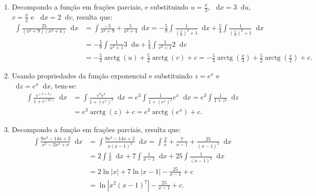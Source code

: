 \documentclass[12pt,a4paper]{article}
\newcommand*\diff{\mathop{}\!\mathrm{d}}
\newcommand*\arctg{\operatorname{arctg}}
\begin{document}
\begin{enumerate}
\begin{enumerate}
\item Decompondo a função em frações parciais, e substituindo $u=\frac{x}{3}$, $\diff x = 3 \diff u$, $v=\frac{x}{2}$ e $\diff x = 2 \diff v$, resulta que:
\begin{align*}
  \int \frac{25}{(x^2+9)(x^2+4)} \diff x
& = \int \frac{-5}{x^2+9} + \frac{5}{x^2+4} \diff x
  = -\frac{5}{9} \int \frac{1}{\left(\frac{x}{3}\right)^2+1} \diff x
   + \frac{5}{4} \int\frac{1}{\left(\frac{x}{2}\right)^2+1} \diff x\\
& = -\frac{5}{9} \int \frac{1}{u^2+1} 3\diff u
  + \frac{5}{4} \int\frac{1}{v^2+1} 2\diff v\\
& = -\frac{5}{3} \arctg(u) + \frac{5}{2} \arctg(v)+c
  = -\frac{5}{3} \arctg\left(\frac{x}{3}\right) + \frac{5}{2} \arctg\left(\frac{x}{2}\right)+c.
\end{align*}

\item Usando propriedades da função exponencial e substituindo $z=e^x$ e $\diff z = e^x \diff x$, tem-se:
\begin{align*}
  \int \frac{e^{(x+3)}}{1+e^{(2x)}} \diff x
&= \int \frac{e^3e^x}{1+(e^x)^2} \diff x
= e^3 \int \frac{1}{1+(e^x)^2} e^x \diff x
= e^3 \int \frac{1}{1+z^2} \diff z\\
&= e^3 \arctg(z)+c
= e^3 \arctg(e^x)+c.
\end{align*}

\item Decompondo a função em frações parciais, resulta que:
\begin{align*}
  \int \frac{9 x^2 - 14 x + 2}{x^3-2x^2+x} \diff x
& = \int \frac{9 x^2 - 14 x + 2}{x(x-1)^2} \diff x
  = \int \frac{2}{x} + \frac{7}{x-1} + \frac{25}{(x-1)^2} \diff x\\
& = 2\int \frac{1}{x} \diff x
  + 7\int \frac{1}{x-1} \diff x
 + 25\int \frac{1}{(x-1)^2} \diff x\\
& = 2\ln|x| + 7\ln|x-1| - \frac{25}{x-1} + c\\
& = \ln|x^2(x-1)^7| - \frac{25}{x-1} + c.
\end{align*}

\end{enumerate}
\end{enumerate}
\end{document}
